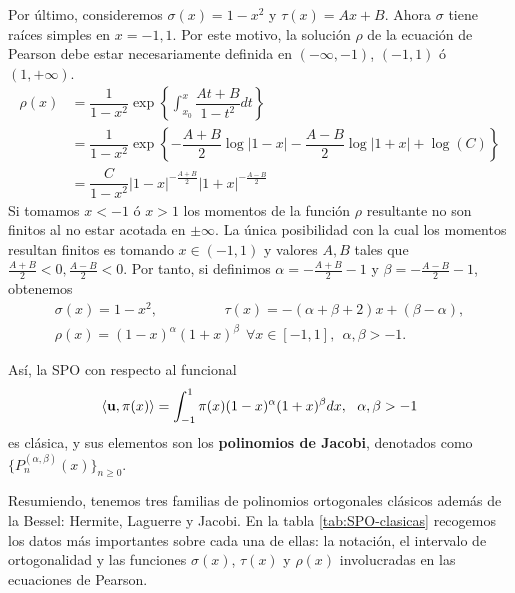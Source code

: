 Por último, consideremos $\sigma(x) = 1-x^2$ y $\tau(x)=Ax+B$. Ahora $\sigma$ tiene raíces simples en $x=-1,1$. Por este motivo, la solución $\rho$ de la ecuación de Pearson debe estar necesariamente definida en $(-\infty,-1)$, $(-1,1)$ ó $(1,+\infty)$.
\begin{equation*}
    \begin{split}
        \rho(x)&=\dfrac{1}{1-x^2}\exp\left\{\int_{x_0}^x\dfrac{At+B}{1-t^2}dt\right\}\\
        &= \dfrac{1}{1-x^2}\exp\left\{-\dfrac{A+B}{2}\log|1-x|-\dfrac{A-B}{2}\log|1+x|+\log(C)\right\}\\
        &= \dfrac{C}{1-x^2}|1-x|^{-\frac{A+B}{2}}|1+x|^{-\frac{A-B}{2}}
    \end{split}
\end{equation*}
Si tomamos $x<-1$ ó $x>1$ los momentos de la función $\rho$ resultante no son finitos al no estar acotada en $\pm\infty$. La única posibilidad con la cual los momentos resultan finitos es tomando $x\in(-1,1)$ y valores $A,B$ tales que $\frac{A+B}{2}<0, \frac{A-B}{2}<0$. Por tanto, si definimos $\alpha = -\frac{A+B}{2}-1$ y $\beta=-\frac{A-B}{2}-1$, obtenemos
\begin{equation}
    \label{eq:parametros-jacobi}
    \begin{array}{c}
        \sigma(x)=1-x^2,\hspace{2cm} \tau(x)=-(\alpha+\beta+2)x+(\beta-\alpha), \\ 
        \rho(x) =(1-x)^{\alpha}(1+x)^{\beta}\ \ \forall x \in[-1,1], \ \ \alpha,\beta > -1.
    \end{array}
\end{equation}

Así, la SPO con respecto al funcional
\begin{equation}
    \label{eq:func-jacobi}
    \left\langle \mathbf{u} , \pi(x) \right\rangle = \int_{-1}^1 \pi(x)(1-x)^{\alpha}(1+x)^{\beta}dx, \ \ \alpha,\beta > -1
\end{equation}
es clásica, y sus elementos son los \textbf{polinomios de Jacobi}, denotados como $\{P_n^{(\alpha,\beta)}(x)\}_{n\geq 0}$.

Resumiendo, tenemos tres familias de polinomios ortogonales clásicos además de la Bessel: Hermite, Laguerre y Jacobi. En la tabla \ref{tab:SPO-clasicas} recogemos los datos más importantes sobre cada una de ellas: la notación, el intervalo de ortogonalidad y las funciones $\sigma(x)$, $\tau(x)$ y $\rho(x)$ involucradas en las ecuaciones de Pearson.

